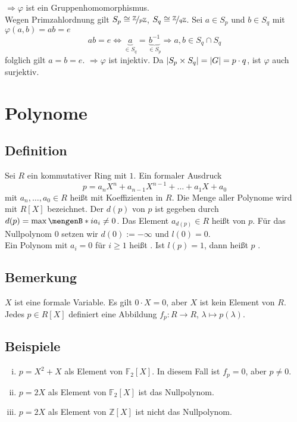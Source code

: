 $\Rightarrow \varphi$ ist ein Gruppenhomomorphismus.\\
Wegen Primzahlordnung gilt $S_p \cong \nicefrac{\mathds{Z}}{p \mathds{Z}}$, $S_q \cong \nicefrac{\mathds{Z}}{q \mathds{Z}}$. Sei $a \in S_p$ und $b \in S_q$ mit $\varphi(a,b)=ab =e$
\[
	a b = e \Leftrightarrow \underbrace{a}_{\in S_q} = \underbrace{b ^{-1} }_{\in S_p} \Rightarrow  a,b \in S_q \cap S_q
\]
folglich gilt $a=b=e$. $\Rightarrow \varphi$ ist injektiv. Da $\abs{S_p \times S_q} = \abs{G}= p \cdot q  $, ist $\varphi$ auch surjektiv. \bewende
\newpage
\section{Polynome} %
\label{sec:5}

\subsection[Definition: Polynom, Grad, Leitkoeffizient]{Definition} %
\label{sub:51}
Sei $R$ ein kommutativer Ring mit $1$. Ein formaler Ausdruck
\[
	p = a_n X^n + a_{n-1} X^{n-1} + \ldots + a_1 X + a_0
\]
mit $a_n, \ldots , a_0 \in R$ heißt  mit Koeffizienten in $R$. Die Menge aller Polynome wird mit $R[X]$ bezeichnet. Der  $d(p)$
von $p$ ist gegeben durch $d(p) = \max \set[i]{a_i \not=0}$. Das Element $a_{d(p)} \in R$ heißt  von $p$. Für das Nullpolynom $0$ setzen wir
$d(0) := - \infty$ und $l(0)=0$. \\
Ein Polynom mit $a_i = 0$ für $i \ge 1$ heißt . Ist $l(p)=1$, dann heißt $p$ . 

\subsection[Bemerkung: $X$ ist nur formale Variable!]{Bemerkung} %
\label{sub:52}
$X$ ist eine formale Variable. Es gilt $0 \cdot X = 0$, aber $X$ ist kein Element von $R$. Jedes $p \in R[X]$ definiert eine Abbildung $f_p : R \to R$, 
$\lambda  \mapsto p(\lambda )$.

\subsection[Beispiele zum Unterschied zwischen einen Polynom und zugehöriger Abbildung]{Beispiele} %
\label{sub:53}
\begin{enumerate}[(i)]
	\item $p= X^2+X$ als Element von $\mathds{F}_2[X]$. In diesem Fall ist $f_p =0$, aber $p \not= 0$.
	\item $p=2X$ als Element von $\mathds{F}_2[X]$ ist das Nullpolynom.
	\item $p=2X$ als Element von $\mathds{Z}[X]$ ist nicht das Nullpolynom.
\end{enumerate}

